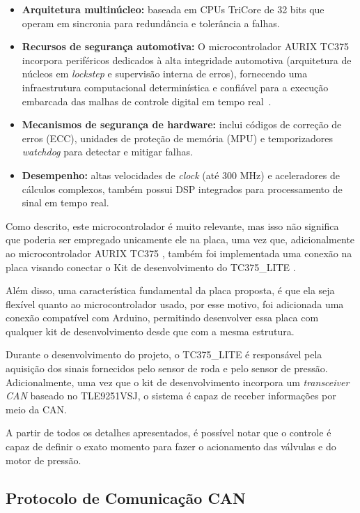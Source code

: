 \begin{itemize}
    \item \textbf{Arquitetura multinúcleo:} baseada em CPUs TriCore de 32 bits que operam em sincronia para redundância e tolerância a falhas.
    \item \textbf{Recursos de segurança automotiva:} O microcontrolador AURIX TC375 incorpora periféricos dedicados à alta integridade automotiva (arquitetura de núcleos em \textit{lockstep} e supervisão interna de erros), fornecendo uma infraestrutura computacional determinística e confiável para a execução embarcada das malhas de controle digital em tempo real~\cite{tc37xDatasheet}.
    \item \textbf{Mecanismos de segurança de hardware:} inclui códigos de correção de erros (ECC), unidades de proteção de memória (MPU) e temporizadores \textit{watchdog} para detectar e mitigar falhas.
    \item \textbf{Desempenho:} altas velocidades de \textit{clock} (até 300 MHz) e aceleradores de cálculos complexos, também possui \gls{DSP} integrados para processamento de sinal em tempo real.
\end{itemize}

Como descrito, este microcontrolador é muito relevante, mas isso não significa que poderia ser empregado unicamente ele na placa, uma vez que, adicionalmente ao microcontrolador AURIX TC375 , também foi implementada uma conexão na placa visando conectar o Kit de desenvolvimento do TC375\_LITE \cite{tc37xEvaluationBoard}. 

Além disso, uma característica fundamental da placa proposta, é que ela seja flexível quanto ao microcontrolador usado, por esse motivo, foi adicionada uma conexão compatível com Arduino, permitindo desenvolver essa placa com qualquer kit de desenvolvimento desde que com a mesma estrutura.

Durante o desenvolvimento do projeto, o TC375\_LITE é responsável pela aquisição dos sinais fornecidos pelo sensor de roda e pelo sensor de pressão. Adicionalmente, uma vez que o kit de desenvolvimento incorpora um \textit{transceiver CAN} baseado no \gls{TLE9251VSJ}, o sistema é capaz de receber informações por meio da \gls{CAN}.

A partir de todos os detalhes apresentados, é possível notar que o controle é capaz de definir o exato momento para fazer o acionamento das válvulas e do motor de pressão. 


\subsection{Protocolo de Comunicação CAN}
\label{sec:metodologia-6-6}

